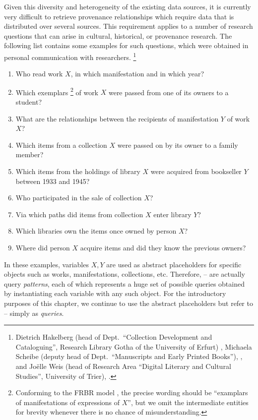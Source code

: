 Given this diversity and heterogeneity of the existing data sources,
it is currently very difficult to retrieve provenance relationships
which require data that is distributed over several sources.
This requirement applies to a number of research questions
that can arise in cultural, historical, or provenance research.
The following list contains some examples for such questions,
which were obtained in personal communication with researchers.%
\footnote{%
  Dietrich Hakelberg 
  (head of Dept.\ \enquote{Collection Development and Cataloguing}, Research Library Gotha of the University of Erfurt)
  \autocite{HakelbergWeb},
  Michaela Scheibe
  (deputy head of Dept.\ \enquote{Manuscripts and Early Printed Books}),
  \autocite{ScheibeWeb},
  and Jo\"elle Weis 
  (head of Research Area \enquote{Digital Literary and Cultural Studies}, University of Trier), 
  \autocite{WeisWeb}.
}
%
\begin{enumerate}
  \item[\exaquery{1}]
    Who read %
    work $X$, in which manifestation and in which year?
  \item[\exaquery{2}]
    Which exemplars%
    \footnote{%
      Conforming to the FRBR model \autocite{FRBR1998},
      the precise wording should be \enquote{examplars of manifestations of expressions of $X$},
      but
      we omit the intermediate entities for brevity whenever there is no chance of misunderstanding.%
    }
    of work $X$
    were passed from one of its owners to a student?
  \item[\exaquery{3}]
    What are the relationships between the recipients of manifestation $Y$ of work $X$?
  \item[\exaquery{4}]
    Which items from a collection $X$ were passed on by its owner to a family member?
  \item[\exaquery{5}]
    Which items from the holdings of library $X$ were acquired from bookseller $Y$
    between 1933 and 1945?
  \item[\exaquery{6}]
    Who participated in the sale of collection $X$?
  \item[\exaquery{7}]
    Via which paths did items from collection $X$ enter library $Y$?
  \item[\exaquery{8}]
    Which libraries own the items once owned by person $X$?
  \item[\exaquery{9}]
    Where did person $X$ acquire items and did they know the previous owners?
\end{enumerate}
%
In these examples, variables $X,Y$ are used as abstract placeholders for specific objects
such as works, manifestations, collections, etc. Therefore, -- are actually
query \emph{patterns}, each of which represents a huge set of possible queries
obtained by instantiating each variable with any such object.
For the introductory purposes of this chapter,
we continue to use the abstract placeholders but refer to --
simply as \emph{queries}. %

